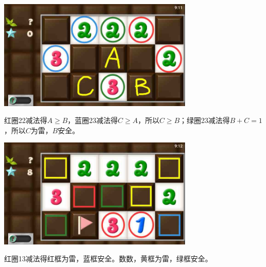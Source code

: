 \subsection{} %
\begin{center}
    \includegraphics[width=0.7\textwidth]{puzzlelow/117-1.jpg}
\end{center}
红圈22减法得$A\ge B$，蓝圈23减法得$C\ge A$，所以$C\ge B$；绿圈23减法得$B+C=1$，所以$C$为雷，$B$安全。
\begin{center}
    \includegraphics[width=0.7\textwidth]{puzzlelow/117-2.jpg}
\end{center}
红圈13减法得红框为雷，蓝框安全。数数，黄框为雷，绿框安全。

